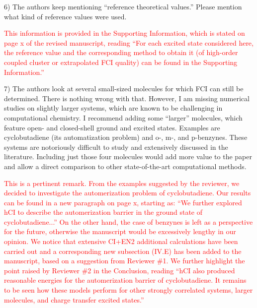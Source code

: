 \documentclass[10pt]{letter}
\newcommand{\alert}[1]{\textcolor{red}{#1}}
\begin{document}
\begin{letter}
{6) The authors keep mentioning ``reference theoretical values.'' Please mention what kind of reference values were used.
}

\alert{
This information is provided in the Supporting Information, which is stated on page x of the revised manuscript, reading
``For each excited state considered here, the reference value and the corresponding method to obtain it (of high-order coupled cluster or extrapolated FCI quality) can be found in the Supporting Information.''
}

{7) The authors look at several small-sized molecules for which FCI can still be determined. There is nothing wrong with that. However, I am missing numerical studies on slightly larger systems, which are known to be challenging in computational chemistry. I recommend adding some ``larger'' molecules, which feature open- and closed-shell ground and excited states. Examples are cyclobutadiene (its automatization problem) and o-, m-, and p-benzynes. These systems are notoriously difficult to study and extensively discussed in the literature. Including just those four molecules would add more value to the paper and allow a direct comparison to other state-of-the-art computational methods.
}

\alert{
This is a pertinent remark.
From the examples suggested by the reviewer, we decided to investigate the automerization problem of cyclobutadiene.
Our results can be found in a new paragraph on page x, starting as:
``We further explored hCI to describe the automerization barrier in the ground state of cyclobutadiene...''
On the other hand, the case of benzynes is left as a perspective for the future, otherwise the manuscript would be excessively lengthy in our opinion.
We notice that extensive CI+EN2 additional calculations have been carried out and a corresponding new subsection (IV.E) has been added to the manuscript, based on a suggestion from Reviewer \#1.
We further highlight the point raised by Reviewer \#2 in the Conclusion, reading
``hCI also produced reasonable energies for the automerization barrier of cyclobutadiene.
It remains to be seen how these models perform for other strongly correlated systems, larger molecules, and charge transfer excited states.''
}

\end{letter}
\end{document}
